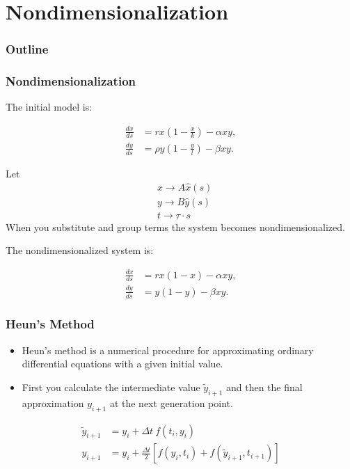 
\section{Nondimensionalization}
\begin{frame}
  \frametitle{Outline}
  \tableofcontents[ currentsection ]
\end{frame}

\begin{frame}
\frametitle{Nondimensionalization}

The initial model is:

  \begin{align*}
    \frac{dx}{ds} & = rx \left(1-\frac{x}{k}\right) - \alpha xy, \\
    \frac{dy}{ds} & = \rho y \left(1-\frac{y}{l}\right) - \beta xy.
  \end{align*}
	
Let 
\begin{align*}
		& x \rightarrow A \hat{x} (s) \\
		& y \rightarrow B \hat{y} (s) \\
		& t \rightarrow \tau \cdot s
\end{align*}
When you substitute and group terms the system becomes nondimensionalized. 
\end{frame}

\begin{frame}
The nondimensionalized system is:

	\begin{align*}
		\frac{d{x}}{ds} &= rx(1-x) - \alpha xy, \\
		\frac{d{y}}{ds} &= y(1-y) - \beta xy.
	\end{align*}
\end{frame}


\begin{frame}
\frametitle{Heun's Method}
\begin{itemize}
\item Heun's method is a numerical procedure for approximating ordinary differential equations with a given initial value.
\item First you calculate the intermediate value $\tilde{y}_{i+1}$ and then the final approximation $y_{i+1}$ at the next generation point.
\end{itemize}

\begin{align*}
	\tilde{y}_{i+1} &= y_i + \Delta t \ f(t_i, y_i) \\
	y_{i+1} &= y_i + \frac{\Delta t}{2} \left[f(y_i,t_i) + f(\tilde{y}_{i+1}, t_{i+1})\right]
\end{align*}
\end{frame}


